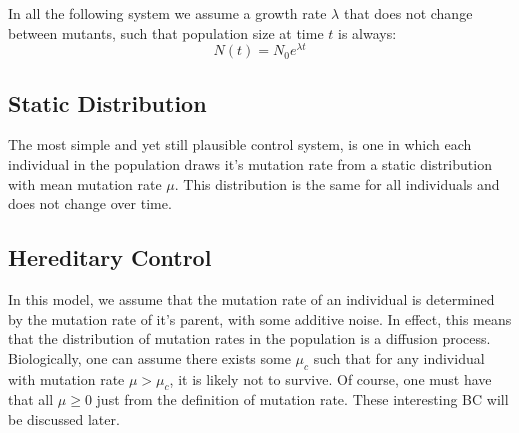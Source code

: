 In all the following system we assume a growth rate $\lambda$ that does not change between mutants,
such that population size at time \(t \) is always:
\begin{equation}
    N(t) = N_{0} e^{\lambda t}
    \label{eq:growth}
\end{equation}

\subsection{Static Distribution}\label{subsec:static}
    The most simple and yet still plausible control system, is one in which each individual in the population draws it's mutation rate
    from a static distribution with mean mutation rate $\mu$.
    This distribution is the same for all individuals and does not change over time.

\subsection{Hereditary Control}\label{subsec:hereditary}
    In this model, we assume that the mutation rate of an individual is determined by the mutation rate of it's parent, with some additive noise.
    In effect, this means that the distribution of mutation rates in the population is a diffusion process.
    Biologically, one can assume there exists some \( \mu_c \) such that for any individual with mutation rate \( \mu > \mu_c \), it is likely not to survive.
    Of course, one must have that all \( \mu \geq 0 \) just from the definition of mutation rate.
    These interesting BC will be discussed later.

